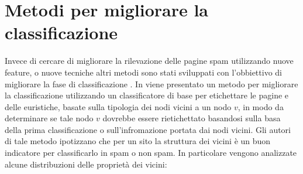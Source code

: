 \section{Metodi per migliorare la classificazione}
Invece di cercare di migliorare la rilevazione delle pagine spam utilizzando nuove feature, o nuove tecniche altri metodi sono stati sviluppati con l'obbiettivo di migliorare la fase di classificazione . In \cite{Gan:2007:IWS:1244408.1244412} viene presentato un metodo per migliorare la classificazione  utilizzando un classificatore di base per etichettare le pagine e delle euristiche, basate sulla tipologia dei nodi vicini a un nodo \(v\), in modo da determinare se tale nodo \(v\) dovrebbe essere rietichettato basandosi sulla basa della prima classificazione o sull'infromazione portata dai nodi vicini. Gli autori di tale metodo ipotizzano che per un sito  la struttura dei vicini è un buon indicatore  per classificarlo in  spam o non spam. In particolare vengono analizzate alcune distribuzioni delle proprietà dei vicini:
